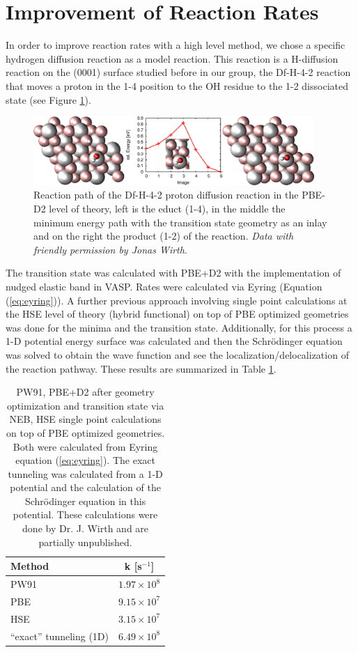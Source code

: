 \documentclass[11pt,DIV=13,BCOR=5mm,a4paper,headinclude]{scrbook}
\begin{document}
\section{Improvement of Reaction Rates}\label{crystal_calc}
In order to improve reaction rates with a high level method, we chose a specific hydrogen diffusion reaction as a model reaction.
This reaction is a H-diffusion reaction on the (0001) surface studied before in our group, the Df-H-4-2 reaction\cite{WirthJPCC2012} that moves a proton in the 1-4 position to the OH residue to the 1-2 dissociated state (see Figure \ref{abb:df-h-4-2}).
\begin{figure}[h]
\centering
\includegraphics[width=0.95\textwidth]{figures/0001/NEB-path/df-h-4-2.pdf}
\caption{Reaction path of the Df-H-4-2 proton diffusion reaction in the PBE-D2 level of theory, left is the educt (1-4), in the middle the minimum energy path with the transition state geometry as an inlay and on the right the product (1-2) of the reaction.
\textit{Data with friendly permission by Jonas Wirth}.}
       \label{abb:df-h-4-2}
\end{figure}
The transition state was calculated with PBE+D2 with the implementation of nudged elastic band in VASP.
Rates were calculated via Eyring (Equation (\ref{eq:eyring})).
A further previous approach involving single point calculations at the HSE level of theory (hybrid functional) on top of PBE optimized geometries was done for the minima and the transition state.
Additionally, for this process a 1-D potential energy surface was calculated and then the Schrödinger equation was solved to obtain the wave function and see the localization/delocalization of the reaction pathway.
These results are summarized in Table \ref{tab:4-2results_jonas}.
\begin{table}[!h]
  \centering
  \caption{PW91, PBE+D2 after geometry optimization and transition state via NEB, HSE single point calculations on top of PBE optimized geometries.
Both were calculated from Eyring equation (\ref{eq:eyring}).
The exact tunneling was calculated from a 1-D potential and the calculation of the Schrödinger equation in this potential.
These calculations were done by Dr. J. Wirth and are partially unpublished.}
\hspace*{-1cm}
 \begin{tabular}{l|c}
 \toprule
 Method&k [s$^{-1}$] \\
    \midrule
 PW91 & $1.97\times 10^8$\\
 PBE & $9.15\times 10^7$\\
 HSE & $3.15\times 10^7$\\
 ``exact'' tunneling (1D) & $6.49\times 10^8$\\\bottomrule
  \end{tabular}
  \label{tab:4-2results_jonas}
\end{table}
\end{document}
